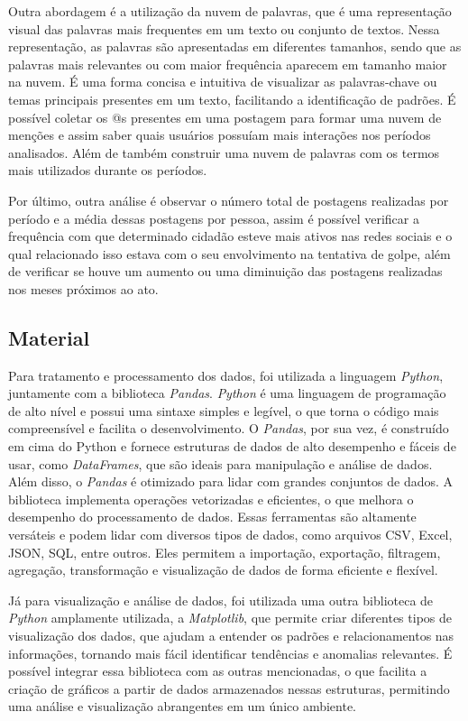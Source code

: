 \documentclass[manuscript,screen,review]{acmart}
\begin{document}
Outra abordagem é a utilização da nuvem de palavras, que é uma representação visual das palavras mais frequentes em um texto ou conjunto de textos. Nessa representação, as palavras são apresentadas em diferentes tamanhos, sendo que as palavras mais relevantes ou com maior frequência aparecem em tamanho maior na nuvem. É uma forma concisa e intuitiva de visualizar as palavras-chave ou temas principais presentes em um texto, facilitando a identificação de padrões. É possível coletar os @s presentes em uma postagem para formar uma nuvem de menções e assim saber quais usuários possuíam mais interações nos períodos analisados. Além de também construir uma nuvem de palavras com os termos mais utilizados durante os períodos.

Por último, outra análise é observar o número total de postagens realizadas por período e a média dessas postagens por pessoa, assim é possível verificar a frequência com que determinado cidadão esteve mais ativos nas redes sociais e o qual relacionado isso estava com o seu envolvimento na tentativa de golpe, além de verificar se houve um aumento ou uma diminuição das postagens realizadas nos meses próximos ao ato.

\subsection{Material}

Para tratamento e processamento dos dados, foi utilizada a linguagem \textit{Python}, juntamente com a biblioteca \textit{Pandas}. \textit{Python} é uma linguagem de programação de alto nível e possui uma sintaxe simples e legível, o que torna o código mais compreensível e facilita o desenvolvimento. O \textit{Pandas}, por sua vez, é construído em cima do Python e fornece estruturas de dados de alto desempenho e fáceis de usar, como \textit{DataFrames}, que são ideais para manipulação e análise de dados. Além disso, o \textit{Pandas} é otimizado para lidar com grandes conjuntos de dados. A biblioteca implementa operações vetorizadas e eficientes, o que melhora o desempenho do processamento de dados. Essas ferramentas são altamente versáteis e podem lidar com diversos tipos de dados, como arquivos CSV, Excel, JSON, SQL, entre outros. Eles permitem a importação, exportação, filtragem, agregação, transformação e visualização de dados de forma eficiente e flexível.

Já para visualização e análise de dados, foi utilizada uma outra biblioteca de \textit{Python} amplamente utilizada, a \textit{Matplotlib}, que permite criar diferentes tipos de visualização dos dados, que ajudam a entender os padrões e relacionamentos nas informações, tornando mais fácil identificar tendências e anomalias relevantes. É possível integrar essa biblioteca com as outras mencionadas, o que facilita a criação de gráficos a partir de dados armazenados nessas estruturas, permitindo uma análise e visualização abrangentes em um único ambiente.
\end{document}
